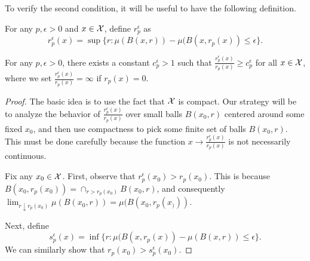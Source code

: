 To verify the second condition, it will be useful to have the following definition. 

\begin{defn}\label{defn:probability_epsilon_radius}
For any $p, \epsilon > 0$ and $x \in \mathcal X$, define $r_p^\epsilon$ as $$r_p^\epsilon(x) = \sup \{r: \mu(B(x, r)) - \mu(B(x, r_p(x)) \leq \epsilon\}.$$ 
\end{defn}

\begin{lem}\label{cl:rad}
For any $p, \epsilon > 0$, there exists a constant $c_p^\epsilon > 1$ such that $\frac{r_p^\epsilon(x)}{r_p(x)} \geq c_p^{\epsilon}$ for all $x \in \mathcal X$, where we set $\frac{r_p^\epsilon(x)}{r_p(x)} = \infty$ if $r_p(x) = 0$. 
\end{lem}

\begin{proof}
The basic idea is to use the fact that $\mathcal X$ is compact. Our strategy will be to analyze the behavior of $\frac{r_p^{\epsilon}(x)}{r_p(x)}$ over small balls $B(x_0, r)$ centered around some fixed $x_0$, and then use compactness to pick some finite set of balls $B(x_0, r)$. This must be done carefully because the function $x \to \frac{r_p^\epsilon(x)}{r_p(x)}$ is not necessarily continuous. 

Fix any $x_0 \in \mathcal X$. First, observe that $r_p^{\epsilon}(x_0) > r_p(x_0)$. This is because $B(x_0, r_p(x_0)) = \cap_{r > r_p(x_0)} B(x_0,r)$, and consequently $\lim_{r \downarrow r_p(x_0)} \mu(B(x_0, r)) = \mu(B(x_0, r_p(x_))).$ 

Next, define $$s_p^\epsilon(x) = \inf\{r: \mu(B(x, r_p(x)) - \mu(B(x,r)) \leq \epsilon\}.$$ We can similarly show that $r_p(x_0) > s_p^{\epsilon}(x_0)$. 


\end{proof}
